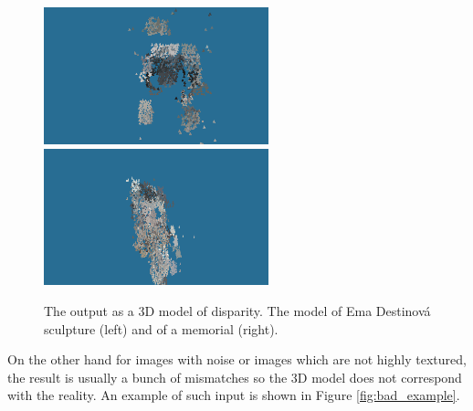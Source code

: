 \begin{figure}[h]
\centerline{
\includegraphics[width=6.5cm]{img/ema_3Dresult.png}
\includegraphics[width=6.5cm]{img/memorial_3Dresult.png}}
\caption{The output as a 3D model of disparity. The model of Ema Destinová sculpture (left) and of a memorial (right).}
\label{fig:outupt_samples}
\end{figure}

On the other hand for images with noise or images which are not highly textured, the result is usually a bunch of mismatches so the 3D model does not correspond with the reality.
An example of such input is shown in Figure \ref{fig:bad_example}.



